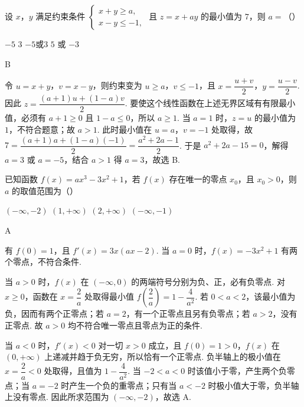 \begin{problem}
设 \(x\)，\(y\) 满足约束条件 \(\begin{cases}
x + y \geqslant a,\\
x - y \leqslant -1,
\end{cases}\) 且 \(z = x + ay\) 的最小值为 \(7\)，则 \(a =\)（\quad）

\choices
    {\(-5\)}
    {\(3\)}
    {\(-5\)或3}
    {\(5\) 或 \(-3\)}
\end{problem}

\begin{answer}
B
\end{answer}

\begin{solution}
令 \(u=x+y\)，\(v=x-y\)，则约束变为 \(u\geqslant a\)，\(v\leqslant-1\)，且 \(x=\dfrac{u+v}{2}\)，\(y=\dfrac{u-v}{2}\). 因此 \(z=\dfrac{(a+1)u+(1-a)v}{2}\). 要使这个线性函数在上述无界区域有有限最小值，必须有 \(a+1\geqslant0\) 且 \(1-a\leqslant0\)，所以 \(a\geqslant1\). 当 \(a=1\) 时，\(z=u\) 的最小值为 \(1\)，不符合题意；故 \(a>1\). 此时最小值在 \(u=a\)，\(v=-1\) 处取得，故 \(7=\dfrac{(a+1)a+(1-a)(-1)}{2}=\dfrac{a^2+2a-1}{2}\). 于是 \(a^2+2a-15=0\)，解得 \(a=3\) 或 \(a=-5\)，结合 \(a>1\) 得 \(a=3\)，故选 B.
\end{solution}

\begin{problem}
已知函数 \( f(x) = ax^3 - 3x^2 + 1 \)，若 \( f(x) \) 存在唯一的零点 \( x_0 \)，且 \( x_0 > 0 \)，则 \( a \) 的取值范围为（\quad）

\choices
    {\((- \infty, -2)\)}
    {\((1, +\infty)\)}
    {\((2, +\infty)\)}
    {\((-\infty, -1)\)}
\end{problem}

\begin{answer}
A
\end{answer}

\begin{solution}
有 \(f(0)=1\)，且 \(f'(x)=3x(ax-2)\). 当 \(a=0\) 时，\(f(x)=-3x^2+1\) 有两个零点，不符合条件.

当 \(a>0\) 时，\(f(x)\) 在 \((-\infty,0)\) 的两端符号分别为负、正，必有负零点. 对 \(x\geqslant0\)，函数在 \(x=\dfrac{2}{a}\) 处取得最小值 \(f\left(\dfrac{2}{a}\right)=1-\dfrac{4}{a^2}\). 若 \(0<a<2\)，该最小值为负，因而有两个正零点；若 \(a=2\)，有一个正零点且另有负零点；若 \(a>2\)，没有正零点. 故 \(a>0\) 均不符合唯一零点且零点为正的条件.

当 \(a<0\) 时，\(f'(x)<0\) 对一切 \(x>0\) 成立，且 \(f(0)=1>0\)，\(f(x)\) 在 \((0,+\infty)\) 上递减并趋于负无穷，所以恰有一个正零点. 负半轴上的极小值在 \(x=\dfrac{2}{a}<0\) 处取得，且值为 \(1-\dfrac{4}{a^2}\). 当 \(-2<a<0\) 时该值小于零，产生两个负零点；当 \(a=-2\) 时产生一个负的重零点；只有当 \(a<-2\) 时极小值大于零，负半轴上没有零点. 因此所求范围为 \((-\infty,-2)\)，故选 A.
\end{solution}

